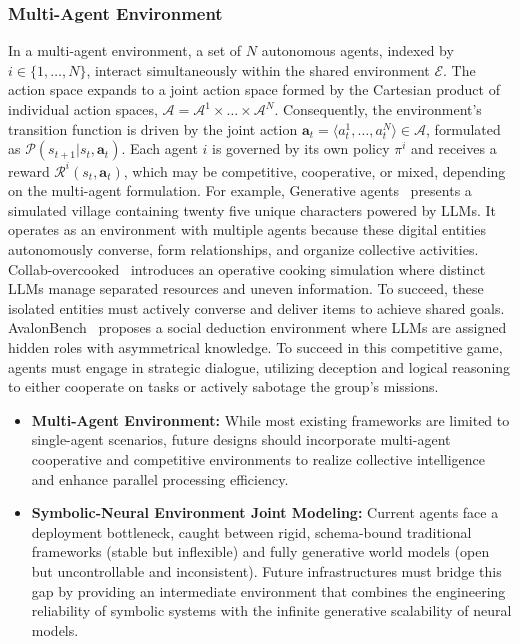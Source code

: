 \documentclass{llmxive}
\begin{document}
\subsubsection{Multi-Agent Environment}
In a multi-agent environment, a set of $N$ autonomous agents, indexed by $i \in \{1, \dots, N\}$, interact simultaneously within the shared environment $\mathcal{E}$. The action space expands to a joint action space formed by the Cartesian product of individual action spaces, $\boldsymbol{\mathcal{A}} = \mathcal{A}^1 \times \dots \times \mathcal{A}^N$. Consequently, the environment's transition function is driven by the joint action $\boldsymbol{a}_t = \langle a_t^1, \dots, a_t^N \rangle \in \boldsymbol{\mathcal{A}}$, formulated as $\mathcal{P}(s_{t+1} | s_t, \boldsymbol{a}_t)$. Each agent $i$ is governed by its own policy $\pi^i$ and receives a reward $\mathcal{R}^i(s_t, \boldsymbol{a}_t)$, which may be competitive, cooperative, or mixed, depending on the multi-agent formulation. For example, Generative agents~\cite{Generative-agents} presents a simulated village containing twenty five unique characters powered by LLMs. It operates as an environment with multiple agents because these digital entities autonomously converse, form relationships, and organize collective activities. Collab-overcooked~\cite{Collab-overcooked} introduces an operative cooking simulation where distinct LLMs manage separated resources and uneven information. To succeed, these isolated entities must actively converse and deliver items to achieve shared goals. AvalonBench~\cite{AvalonBench} proposes a social deduction environment where LLMs are assigned hidden roles with asymmetrical knowledge. To succeed in this competitive game, agents must engage in strategic dialogue, utilizing deception and logical reasoning to either cooperate on tasks or actively sabotage the group's missions.





\begin{tcolorbox}[takeaway,title={Takeaway 3}]
\begin{itemize}
    \item \textbf{Multi-Agent Environment:} While most existing frameworks are limited to single-agent scenarios, future designs should incorporate multi-agent cooperative and competitive environments to realize collective intelligence and enhance parallel processing efficiency.
    \item \textbf{Symbolic-Neural Environment Joint Modeling:} Current agents face a deployment bottleneck, caught between rigid, schema-bound traditional frameworks (stable but inflexible) and fully generative world models (open but uncontrollable and inconsistent). Future infrastructures must bridge this gap by providing an intermediate environment that combines the engineering reliability of symbolic systems with the infinite generative scalability of neural models.
\end{itemize}
\end{tcolorbox}
\end{document}
